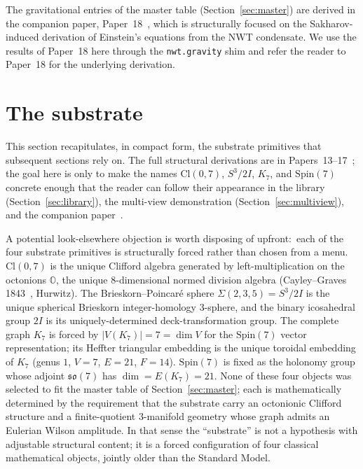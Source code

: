 \documentclass[11pt]{article}
\newcommand{\so}{\mathfrak{so}}
\newcommand{\Spin}{\mathrm{Spin}}
\begin{document}
The gravitational entries of the master table
(Section~\ref{sec:master}) are derived in the companion paper,
Paper~18~\cite{paper18}, which is structurally focused on the
Sakharov-induced derivation of Einstein's equations from the NWT
condensate.  We use the results of Paper~18 here through the
\texttt{nwt.gravity} shim and refer the reader to Paper~18 for
the underlying derivation.

\section{The substrate}
\label{sec:substrate}

This section recapitulates, in compact form, the substrate primitives
that subsequent sections rely on.  The full structural derivations
are in Papers~13--17~\cite{paper14, paper15, paper16, paper17}; the
goal here is only to make the names $\mathrm{Cl}(0,7)$, $S^3/2I$,
$K_7$, and $\Spin(7)$ concrete enough that the reader can follow
their appearance in the library (Section~\ref{sec:library}), the
multi-view demonstration (Section~\ref{sec:multiview}), and the
companion paper~\cite{paper18}.

A potential look-elsewhere objection is worth disposing of
upfront:\ each of the four substrate primitives is structurally
forced rather than chosen from a menu.
$\mathrm{Cl}(0,7)$ is the unique Clifford algebra generated by
left-multiplication on the octonions $\mathbb O$, the unique
$8$-dimensional normed division algebra (Cayley--Graves
1843~\cite{cayley1845}, Hurwitz).  The Brieskorn--Poincar\'e sphere
$\Sigma(2,3,5) = S^3/2I$ is the unique spherical Brieskorn
integer-homology $3$-sphere, and the binary icosahedral group
$2I$ is its uniquely-determined deck-transformation group.  The
complete graph $K_7$ is forced by $|V(K_7)| = 7 = \dim V$ for the
$\Spin(7)$ vector representation; its Heffter triangular embedding
is the unique toroidal embedding of $K_7$ (genus $1$,
$V\!=\!7$, $E\!=\!21$, $F\!=\!14$).  $\Spin(7)$ is fixed as the
holonomy group whose adjoint $\so(7)$ has $\dim = E(K_7) = 21$.
None of these four objects was selected to fit the master table
of Section~\ref{sec:master}; each is mathematically determined by
the requirement that the substrate carry an octonionic Clifford
structure and a finite-quotient $3$-manifold geometry whose graph
admits an Eulerian Wilson amplitude.  In that sense the
``substrate'' is not a hypothesis with adjustable structural
content; it is a forced configuration of four classical
mathematical objects, jointly older than the Standard Model.
\end{document}
